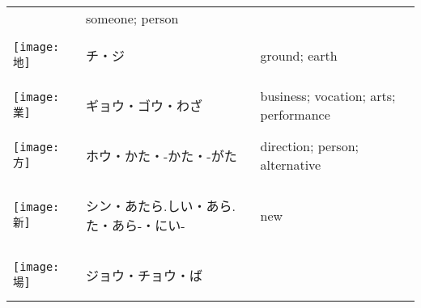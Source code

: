 \documentclass[a4paper,12pt]{extarticle}
\begin{document}
\begin{longtable}{|lp{6cm}p{4cm}|}
&
someone; person
\\ 
\begin{minipage}{0.3\textwidth}
\centerline{
	\texttt{[image: 地]}
}
\end{minipage}
&
\begin{CJK}{UTF8}{min}チ・ジ\end{CJK}
&
ground; earth
\\ 
\begin{minipage}{0.3\textwidth}
\centerline{
	\texttt{[image: 業]}
}
\end{minipage}
&
\begin{CJK}{UTF8}{min}ギョウ・ゴウ・わざ\end{CJK}
&
business; vocation; arts; performance
\\ 
\begin{minipage}{0.3\textwidth}
\centerline{
	\texttt{[image: 方]}
}
\end{minipage}
&
\begin{CJK}{UTF8}{min}ホウ・かた・-かた・-がた\end{CJK}
&
direction; person; alternative
\\ 
\begin{minipage}{0.3\textwidth}
\centerline{
	\texttt{[image: 新]}
}
\end{minipage}
&
\begin{CJK}{UTF8}{min}シン・あたら.しい・あら.た・あら-・にい-\end{CJK}
&
new
\\ 
\begin{minipage}{0.3\textwidth}
\centerline{
	\texttt{[image: 場]}
}
\end{minipage}
&
\begin{CJK}{UTF8}{min}ジョウ・チョウ・ば\end{CJK}

\end{longtable}
\end{document}

